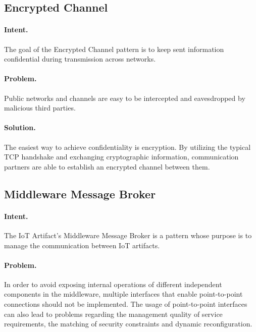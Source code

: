 \subsection{Encrypted Channel~\cite{Papoutsakis2021}} 
\label{p:ec}

\paragraph{\textbf{Intent.}} The goal of the Encrypted Channel pattern is to keep sent information confidential during transmission across networks. 

\paragraph{\textbf{Problem.}} Public networks and channels are easy to be intercepted and eavesdropped by malicious third parties.

\paragraph{\textbf{Solution.}} The easiest way to achieve confidentiality is encryption. By utilizing the typical TCP handshake and exchanging cryptographic information, communication partners are able to establish an encrypted channel between them. 


\subsection{Middleware Message Broker~\cite{Tkaczyk2018}} 
\label{p:broker}

\paragraph{\textbf{Intent.}} The IoT Artifact's Middleware Message Broker is a pattern whose purpose is to manage the communication between IoT artifacts.

\paragraph{\textbf{Problem.}} In order to avoid exposing internal operations of different independent components in the middleware, multiple interfaces that enable point-to-point connections should not be implemented. The usage of point-to-point interfaces can also lead to problems regarding the management quality of service requirements, the matching of security constraints and dynamic reconfiguration.

